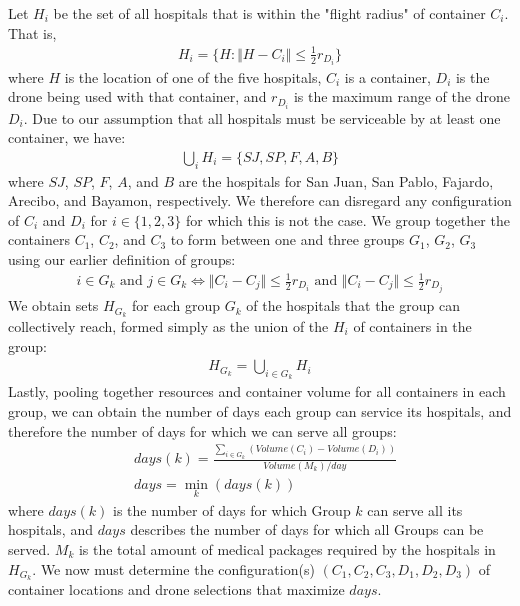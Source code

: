 Let $H_i$ be the set of all hospitals that is within the "flight radius" of container $C_i$. That is,
\begin{align*}
    H_i = \{H: \Vert H - C_i \Vert \leq \frac{1}{2} r_{D_i}\}
\end{align*}
where $H$ is the location of one of the five hospitals, $C_i$ is a container, $D_i$ is the drone being used with that container, and $r_{D_i}$ is the maximum range of the drone $D_i$.   
Due to our assumption that all hospitals must be serviceable by at least one container, we have:
\begin{align*}
    \bigcup_i H_i = \{SJ, SP, F, A, B\}
\end{align*}
where $SJ$, $SP$, $F$, $A$, and $B$ are the hospitals for San Juan, San Pablo, Fajardo, Arecibo, and Bayamon, respectively.  We therefore can disregard any configuration of $C_i$ and $D_i$ for $i \in \{1, 2, 3\}$ for which this is not the case.
We group together the containers $C_1$, $C_2$, and $C_3$ to form between one and three groups $G_1$, $G_2$, $G_3$ using our earlier definition of groups:  
\begin{align*}
    i \in G_k \text{ and } j \in G_k \iff \Vert C_i - C_j \Vert \leq \frac{1}{2} r_{D_i} \text{ and } \Vert C_i - C_j \Vert \leq \frac{1}{2} r_{D_j} 
\end{align*}
We obtain sets $H_{G_k}$ for each group $G_k$ of the hospitals that the group can collectively reach, formed simply as the union of the $H_i$ of containers in the group:
\begin{align*}
    H_{G_k} = \bigcup_{i \in G_k} H_i
\end{align*}
Lastly, pooling together resources and container volume for all containers in each group, we can obtain the number of days each group can service its hospitals, and therefore the number of days for which we can serve all groups:
\begin{align*}
    &days (k) = \frac{\sum_{i \in G_k} (Volume (C_i) - Volume (D_i))}{Volume (M_k)/day} \\
    &days = \min_k (days (k))
\end{align*}
where $days (k)$ is the number of days for which Group $k$ can serve all its hospitals, and $days$ describes the number of days for which all Groups can be served. $M_k$ is the total amount of medical packages required by the hospitals in $H_{G_k}$.  We now must determine the configuration(s) $(C_1, C_2, C_3, D_1, D_2, D_3)$ of container locations and drone selections that maximize $days$.


